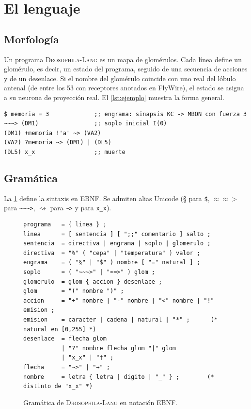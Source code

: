 \documentclass[11pt,a4paper]{article}
\theoremstyle{plain}
\theoremstyle{definition}
\theoremstyle{remark}
\newcommand{\dros}{\textup{\textsc{Drosophila-Lang}}}
\begin{document}
\section{El lenguaje}
\label{sec:lenguaje}

\subsection{Morfología}

Un programa \dros{} es un mapa de glomérulos. Cada línea define un glomérulo,
es decir, un estado del programa, seguido de una secuencia de acciones y de un
desenlace. Si el nombre del glomérulo coincide con uno real del lóbulo antenal
(de entre los 53 con receptores anotados en FlyWire), el estado se asigna a su
neurona de proyección real. El \cref{lst:ejemplo} muestra la forma general.

\begin{lstlisting}[style=dros,caption={Forma general de un programa.},label={lst:ejemplo}]
%cepa Canton-S            ;; semilla del ruido neuronal
$ memoria = 3             ;; engrama: sinapsis KC -> MBON con fuerza 3
~~~> (DM1)                ;; soplo inicial I(0)
(DM1) +memoria !'a' ~> (VA2)
(VA2) ?memoria ~> (DM1) | (DL5)
(DL5) x_x                 ;; muerte
\end{lstlisting}

\subsection{Gramática}

La \cref{fig:ebnf} define la sintaxis en EBNF. Se admiten alias Unicode
(\S{} para \texttt{\$}, $\approx\approx>$ para \texttt{\textasciitilde\textasciitilde\textasciitilde>},
$\rightsquigarrow$ para \texttt{\textasciitilde>} y \dag{} para \texttt{x\_x}).

\begin{figure}[t]
\begin{lstlisting}[basicstyle=\ttfamily\footnotesize]
programa   = { linea } ;
linea      = [ sentencia ] [ ";;" comentario ] salto ;
sentencia  = directiva | engrama | soplo | glomerulo ;
directiva  = "%" ( "cepa" | "temperatura" ) valor ;
engrama    = ( "§" | "$" ) nombre [ "=" natural ] ;
soplo      = ( "~~~>" | "≈≈>" ) glom ;
glomerulo  = glom { accion } desenlace ;
glom       = "(" nombre ")" ;
accion     = "+" nombre | "-" nombre | "<" nombre | "!" emision ;
emision    = caracter | cadena | natural | "*" ;      (* natural en [0,255] *)
desenlace  = flecha glom
           | "?" nombre flecha glom "|" glom
           | "x_x" | "†" ;
flecha     = "~>" | "⇝" ;
nombre     = letra { letra | digito | "_" } ;        (* distinto de "x_x" *)
\end{lstlisting}
\caption{Gramática de \dros{} en notación EBNF.}
\label{fig:ebnf}
\end{figure}
\end{document}
